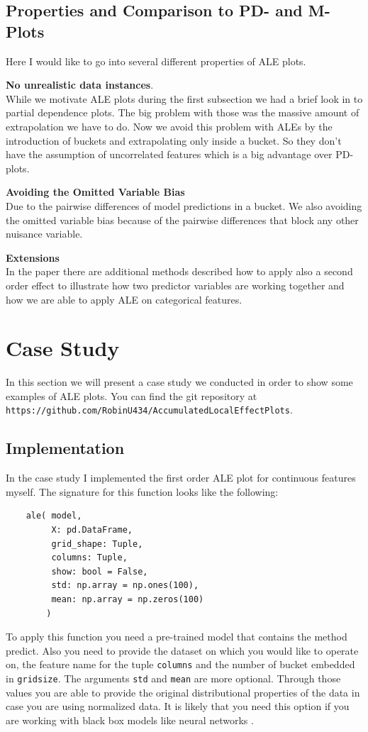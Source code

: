 \documentclass[11pt,
  a4paper,
  parskip=half, %
  BCOR=10mm, %
  english,
  ]{article}
\begin{document}
\subsection{Properties and Comparison to PD- and M-Plots}
Here I would like to go into several different properties of ALE plots.

\textbf{No unrealistic data instances}. \\
While we motivate ALE plots during the first subsection we had a brief look in to partial dependence plots. The big problem with those was the massive amount of extrapolation we have to do. Now we avoid this problem with ALEs by the introduction of buckets and extrapolating only inside a bucket.
So they don't have the assumption of uncorrelated features which is a big advantage over PD-plots. \cite{ALE-paper}

\textbf{Avoiding the Omitted Variable Bias}\\
Due to the pairwise differences of model predictions in a bucket. We also avoiding the omitted variable bias because of the pairwise differences that block any other nuisance variable. \cite{ALE-paper}

\textbf{Extensions} \\
In the paper there are additional methods described how to apply also a second order effect to illustrate how two predictor variables are working together and how we are able to apply ALE on categorical features. \cite{ALE-paper}\cite{molnar2022}


\section{Case Study}
In this section we will present a case study we conducted in order to show some examples of ALE plots. You can find the git repository at \texttt{https://github.com/RobinU434/AccumulatedLocalEffectPlots}.


\subsection{Implementation} \label{section:Implementation}
In the case study I implemented the first order ALE plot for continuous features myself. The signature for this function looks like the following:
\begin{verbatim}
    ale( model,
         X: pd.DataFrame,
         grid_shape: Tuple,
         columns: Tuple,
         show: bool = False,
         std: np.array = np.ones(100), 
         mean: np.array = np.zeros(100)
        )
\end{verbatim}
To apply this function you need a pre-trained model that contains the method predict. Also you need to provide the dataset on which you would like to operate on, the feature name for the tuple \texttt{columns} and the number of bucket embedded in \texttt{grid\textunderscore size}.
The arguments \texttt{std} and \texttt{mean} are more optional. Through those values you are able to provide the original distributional properties of the data in case you are using normalized data.
It is likely that you need this option if you are working with black box models like neural networks \cite{Goodfellow-et-al-2016}.
\end{document}
